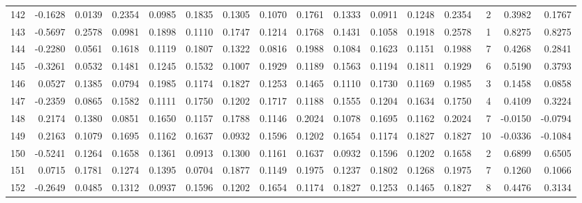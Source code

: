 \begin{tabular}{lrrrrrrrrrrrrrrr}
142 &     -0.1628 &  0.0139 &  0.2354 &  0.0985 &  0.1835 &  0.1305 &  0.1070 &  0.1761 &  0.1333 &  0.0911 &   0.1248 &     0.2354 &      2 &                    0.3982 &                     0.1767 \\
143 &     -0.5697 &  0.2578 &  0.0981 &  0.1898 &  0.1110 &  0.1747 &  0.1214 &  0.1768 &  0.1431 &  0.1058 &   0.1918 &     0.2578 &      1 &                    0.8275 &                     0.8275 \\
144 &     -0.2280 &  0.0561 &  0.1618 &  0.1119 &  0.1807 &  0.1322 &  0.0816 &  0.1988 &  0.1084 &  0.1623 &   0.1151 &     0.1988 &      7 &                    0.4268 &                     0.2841 \\
145 &     -0.3261 &  0.0532 &  0.1481 &  0.1245 &  0.1532 &  0.1007 &  0.1929 &  0.1189 &  0.1563 &  0.1194 &   0.1811 &     0.1929 &      6 &                    0.5190 &                     0.3793 \\
146 &      0.0527 &  0.1385 &  0.0794 &  0.1985 &  0.1174 &  0.1827 &  0.1253 &  0.1465 &  0.1110 &  0.1730 &   0.1169 &     0.1985 &      3 &                    0.1458 &                     0.0858 \\
147 &     -0.2359 &  0.0865 &  0.1582 &  0.1111 &  0.1750 &  0.1202 &  0.1717 &  0.1188 &  0.1555 &  0.1204 &   0.1634 &     0.1750 &      4 &                    0.4109 &                     0.3224 \\
148 &      0.2174 &  0.1380 &  0.0851 &  0.1650 &  0.1157 &  0.1788 &  0.1146 &  0.2024 &  0.1078 &  0.1695 &   0.1162 &     0.2024 &      7 &                   -0.0150 &                    -0.0794 \\
149 &      0.2163 &  0.1079 &  0.1695 &  0.1162 &  0.1637 &  0.0932 &  0.1596 &  0.1202 &  0.1654 &  0.1174 &   0.1827 &     0.1827 &     10 &                   -0.0336 &                    -0.1084 \\
150 &     -0.5241 &  0.1264 &  0.1658 &  0.1361 &  0.0913 &  0.1300 &  0.1161 &  0.1637 &  0.0932 &  0.1596 &   0.1202 &     0.1658 &      2 &                    0.6899 &                     0.6505 \\
151 &      0.0715 &  0.1781 &  0.1274 &  0.1395 &  0.0704 &  0.1877 &  0.1149 &  0.1975 &  0.1237 &  0.1802 &   0.1268 &     0.1975 &      7 &                    0.1260 &                     0.1066 \\
152 &     -0.2649 &  0.0485 &  0.1312 &  0.0937 &  0.1596 &  0.1202 &  0.1654 &  0.1174 &  0.1827 &  0.1253 &   0.1465 &     0.1827 &      8 &                    0.4476 &                     0.3134 \\

\end{tabular}
